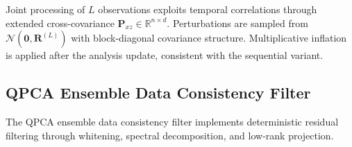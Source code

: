 \documentclass[11pt,a4paper]{article}
\begin{document}
Joint processing of $L$ observations exploits temporal correlations through extended cross-covariance $\mathbf{P}_{xz} \in \mathbb{R}^{n \times d}$. Perturbations are sampled from $\mathcal{N}(\mathbf{0}, \mathbf{R}^{(L)})$ with block-diagonal covariance structure. Multiplicative inflation is applied after the analysis update, consistent with the sequential variant.

\subsection{QPCA Ensemble Data Consistency Filter}\label{app:qpca_endcf}

The QPCA ensemble data consistency filter implements deterministic residual filtering through whitening, spectral decomposition, and low-rank projection.
\end{document}
